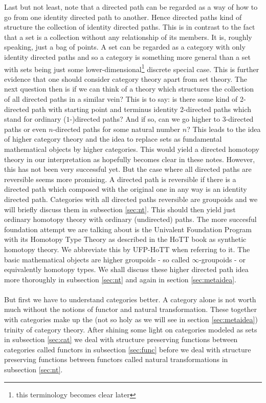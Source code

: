 Last but not least, note that a directed path can be regarded as a way of how to go from one identity directed path to another. Hence directed paths kind of structure the collection of identity directed paths. This is in contrast to the fact that a set is a collection without any relationship of its members. It is, roughly speaking, just a bag of points. A set can be regarded as a category with only identity directed paths and so a category is something more general than a set with sets being just some lower-dimensional\footnote{this terminology becomes clear later} discrete special case. This is further evidence that one should consider category theory apart from set theory. The next question then is if we can think of a theory which structures the collection of all directed paths in a similar vein? This is to say: is there some kind of 2-directed path with starting point and terminus identity 2-directed paths which stand for ordinary ($1$-)directed paths? And if so, can we go higher to $3$-directed paths or even $n$-directed paths for some natural number $n$? This leads to the idea of higher category theory and the idea to replace sets as fundamental mathematical objects by higher categories. This would yield a {\glqq}directed homotopy theory{\glqq} in our interpretation as hopefully becomes clear in these notes. However, this has not been very successful yet. But the case where all directed paths are reversible seems more promising. A directed path is reversible if there is a directed path which composed with the original one in any way is an identity directed path. Categories with all directed paths reversible are groupoids and we will briefly discuss them in subsection \ref{sec:nt}. This should then yield just ordinary homotopy theory with ordinary (undirected) paths. The more succesful foundation attempt we are talking about is the Univalent Foundation Program with its Homotopy Type Theory as described in the HoTT book \cite{1ba1603e} as {\glqq}synthetic{\grqq} homotopy theory. We abbreviate this by UFP-HoTT when referring to it. The basic mathematical objects are higher groupoids - so called $\infty$-groupoids - or equivalently homotopy types. We shall discuss these higher directed path idea more thoroughly in subsection \ref{sec:nt} and again in section \ref{sec:metaidea}.
\\\\
But first we have to understand categories better. A category alone is not worth much without the notions of functor and natural transformation. These together with categories make up the (not so holy as we will see in section \ref{sec:metaidea}) trinity of category theory. After shining some light on categories modeled as sets in subsection \ref{sec:cat} we deal with structure preserving functions between categories called functors in subsection \ref{sec:func} before we deal with structure preserving functions between functors called natural transformations in subsection \ref{sec:nt}.
